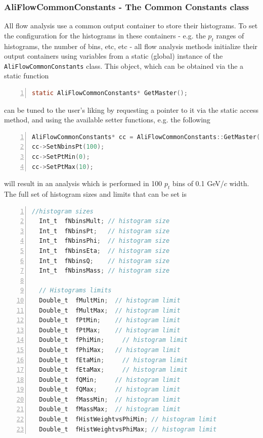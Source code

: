\documentclass[a4paper]{book}
\numberwithin{equation}{subsection}
\begin{document}
\subsubsection{AliFlowCommonConstants - The Common Constants class}
All flow analysis use a common output container to store their histograms. To set the configuration for the histograms in these containers - e.g. the $p_t$ ranges of histograms, the number of bins, etc, etc - all flow analysis methods initialize their output containers using variables from a static (global) instance of the \texttt{AliFlowCommonConstants} class. This object, which can be obtained via the a static function
\begin{lstlisting}[language=C, numbers=left]
static AliFlowCommonConstants* GetMaster(); \end{lstlisting} 
can be tuned to the  user's liking by requesting a pointer to it via the static access method, and using the available setter functions, e.g. the following
\begin{lstlisting}[language=C, numbers=left]
AliFlowCommonConstants* cc = AliFlowCommonConstants::GetMaster();
cc->SetNbinsPt(100);
cc->SetPtMin(0);
cc->SetPtMax(10); \end{lstlisting}
will result in an analysis which is performed in 100 $p_t$ bins of 0.1 GeV/$c$ width. The full set of histogram sizes and limits that can be set is

\begin{lstlisting}[language=C, numbers=left]
 //histogram sizes
  Int_t  fNbinsMult; // histogram size
  Int_t  fNbinsPt;   // histogram size
  Int_t  fNbinsPhi;  // histogram size
  Int_t  fNbinsEta;  // histogram size
  Int_t  fNbinsQ;    // histogram size
  Int_t  fNbinsMass; // histogram size
 
  // Histograms limits
  Double_t  fMultMin;  // histogram limit 
  Double_t  fMultMax;  // histogram limit
  Double_t  fPtMin;    // histogram limit
  Double_t  fPtMax;    // histogram limit
  Double_t  fPhiMin;	 // histogram limit
  Double_t  fPhiMax;   // histogram limit
  Double_t  fEtaMin;	 // histogram limit
  Double_t  fEtaMax;	 // histogram limit
  Double_t  fQMin;	   // histogram limit
  Double_t  fQMax;     // histogram limit
  Double_t  fMassMin;  // histogram limit 
  Double_t  fMassMax;  // histogram limit
  Double_t  fHistWeightvsPhiMin; // histogram limit
  Double_t  fHistWeightvsPhiMax; // histogram limit\end{lstlisting}
  
\end{document}
